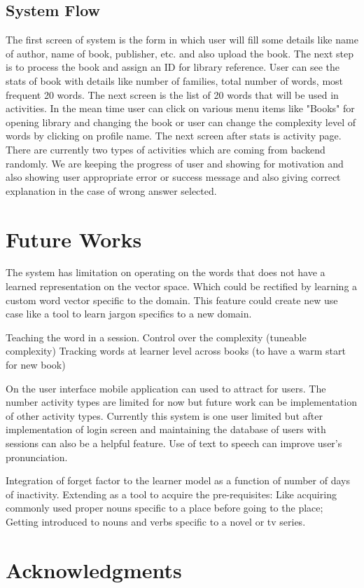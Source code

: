 \documentclass[11pt,a4paper]{article}
\begin{document}
\subsection{System Flow}
The first screen of system is the form in which user will fill some details like name of author, name of book, publisher, etc. and also upload the book. The next step is to process the book and assign an ID for library reference. User can see the stats of book with details like number of families, total number of words, most frequent 20 words. 
The next screen is the list of 20 words that will be used in activities. In the mean time user can click on various menu items like "Books" for opening library and changing the book or user can change the complexity level of words by clicking on profile name. The next screen after stats is activity page. There are currently two types of activities which are coming from backend randomly. We are keeping the progress of user and showing for motivation and also showing user appropriate error or success message and also giving correct explanation in the case of wrong answer selected. 


\section{Future Works}
The system has limitation on operating on the words that does not have a learned
representation on the vector space. Which could be rectified by learning a
custom word vector specific to the domain. This feature could create new use case
like a tool to learn jargon specifics to a new domain.

Teaching the word in a session.
Control over the complexity (tuneable complexity)
Tracking words at learner level across books (to have a warm start for new book)

On the user interface mobile application can used to attract for users. The number activity types are limited for now but future work can be implementation of other activity types. Currently this system is one user limited but after implementation of login screen and maintaining the database of users with sessions can also be a helpful feature. Use of text to speech can improve user's pronunciation. 

Integration of forget factor to the learner model as a function of number of days of inactivity.
Extending as a tool to acquire the pre-requisites: Like acquiring commonly used proper nouns specific to a place before going to the place; Getting introduced to nouns and verbs specific to a novel or tv series.


\section*{Acknowledgments}



\end{document}
